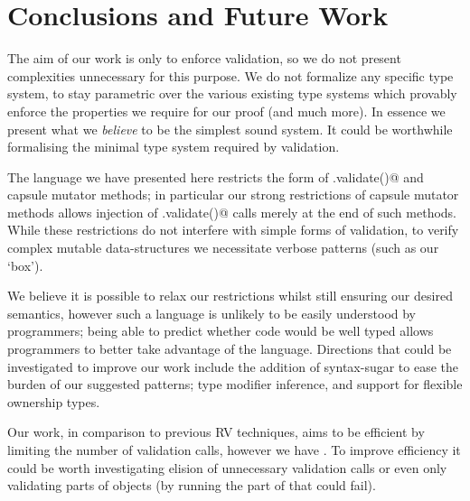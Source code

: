 \section{Conclusions and Future Work}
The aim of our work is only to enforce validation, so we do not present complexities unnecessary for this purpose. We do not formalize any specific type system, to stay parametric over 
the various existing type systems which provably enforce the properties we require for our proof (and much more).
In essence we present what we \emph{believe} to be the simplest sound system.
It could be worthwhile formalising the minimal type system required by validation.






The language we have presented here restricts the form of \Q@.validate()@
and capsule mutator methods; in particular
our strong restrictions of capsule mutator methods
allows injection of \Q@.validate()@ calls merely at the end of such methods.
While these restrictions do not interfere with simple
forms of validation, to verify complex mutable data-structures we necessitate verbose patterns (such as our `box').

We believe it is possible to relax our restrictions whilst
still ensuring our desired semantics, however such a language is unlikely to be easily understood by programmers;
being able to predict whether code would be well typed allows programmers
to better take advantage of the language.
Directions that could be investigated to improve our work include the addition of syntax-sugar to ease the burden of our suggested patterns; type modifier inference, and support for flexible ownership types.

Our work, in comparison to previous RV techniques, aims to be efficient by limiting the number of validation calls, however we have .
To improve efficiency it could be worth investigating elision of unnecessary validation calls
or even only validating parts of objects (by running the part of \Q@validate@ that could fail).